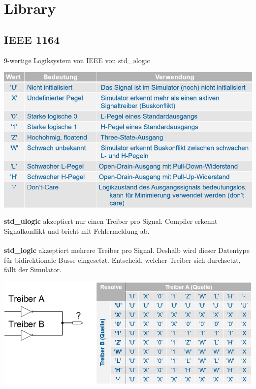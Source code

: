 \section{Library}
\subsection{IEEE 1164}
9-wertige Logiksystem von IEEE von std\_\textit{u}logic
\begin{center}
	\includegraphics[width=\columnwidth]{Images/ieee_typen}
\end{center}
\textbf{std\_ulogic} akzeptiert nur einen Treiber pro Signal. Compiler erkennt Signalkonflikt und bricht mit Fehlermeldung ab.\\~\\
\textbf{std\_logic} akzeptiert mehrere Treiber pro Signal. Deshalb wird dieser Datentype für bidirektionale Busse eingesetzt. Entscheid, welcher Treiber sich durchsetzt, fällt der Simulator.
\begin{center}
	\includegraphics[width=\columnwidth]{Images/ieee_typen1}
\end{center}

